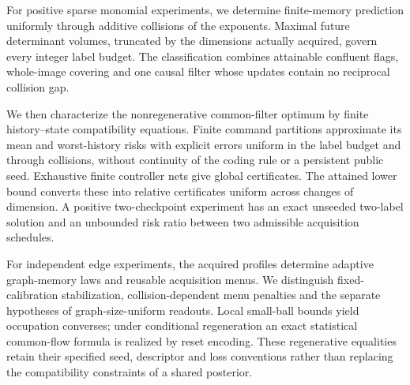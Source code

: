 For positive sparse monomial experiments, we determine finite-memory
prediction uniformly through additive collisions of the exponents.
Maximal future determinant volumes, truncated by the dimensions actually
acquired, govern every integer label budget. The classification combines
attainable confluent flags, whole-image covering and one causal filter
whose updates contain no reciprocal collision gap.

We then characterize the nonregenerative common-filter optimum by finite
history--state compatibility equations. Finite command partitions
approximate its mean and worst-history risks with explicit errors uniform
in the label budget and through collisions, without continuity of the
coding rule or a persistent public seed. Exhaustive finite controller nets
give global certificates. The attained lower bound converts these into
relative certificates uniform across changes of dimension. A positive
two-checkpoint experiment has an exact unseeded two-label solution and an
unbounded risk ratio between two admissible acquisition schedules.

For independent edge experiments, the acquired profiles determine
adaptive graph-memory laws and reusable acquisition menus. We distinguish
fixed-calibration stabilization, collision-dependent menu penalties and
the separate hypotheses of graph-size-uniform readouts. Local small-ball
bounds yield occupation converses; under conditional regeneration an exact
statistical common-flow formula is realized by reset encoding. These
regenerative equalities retain their specified seed, descriptor and loss
conventions rather than replacing the compatibility constraints of a
shared posterior.
